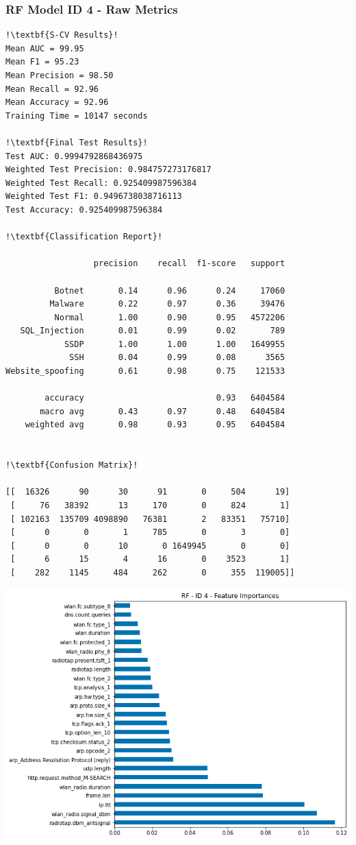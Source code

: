 \begin{appendices}
\newpage
\subsubsection{RF Model ID 4 - Raw Metrics}
\begin{lstlisting}[escapechar=!]
!\textbf{S-CV Results}!
Mean AUC = 99.95
Mean F1 = 95.23
Mean Precision = 98.50
Mean Recall = 92.96
Mean Accuracy = 92.96
Training Time = 10147 seconds

!\textbf{Final Test Results}!
Test AUC: 0.9994792868436975
Weighted Test Precision: 0.984757273176817
Weighted Test Recall: 0.925409987596384
Weighted Test F1: 0.9496738038716113
Test Accuracy: 0.925409987596384

!\textbf{Classification Report}!

                  precision    recall  f1-score   support

          Botnet       0.14      0.96      0.24     17060
         Malware       0.22      0.97      0.36     39476
          Normal       1.00      0.90      0.95   4572206
   SQL_Injection       0.01      0.99      0.02       789
            SSDP       1.00      1.00      1.00   1649955
             SSH       0.04      0.99      0.08      3565
Website_spoofing       0.61      0.98      0.75    121533
           
        accuracy                           0.93   6404584
       macro avg       0.43      0.97      0.48   6404584
    weighted avg       0.98      0.93      0.95   6404584
    
    
!\textbf{Confusion Matrix}!

[[  16326      90      30      91       0     504      19]
 [     76   38392      13     170       0     824       1]
 [ 102163  135709 4098890   76381       2   83351   75710]
 [      0       0       1     785       0       3       0]
 [      0       0      10       0 1649945       0       0]
 [      6      15       4      16       0    3523       1]
 [    282    1145     484     262       0     355  119005]]
\end{lstlisting}
\begin{center}
	\centering
	\includegraphics[width=\textwidth]{Appendices/Images/RF/Model4/RF_Model4_FI.png}
\end{center}


\end{appendices}
